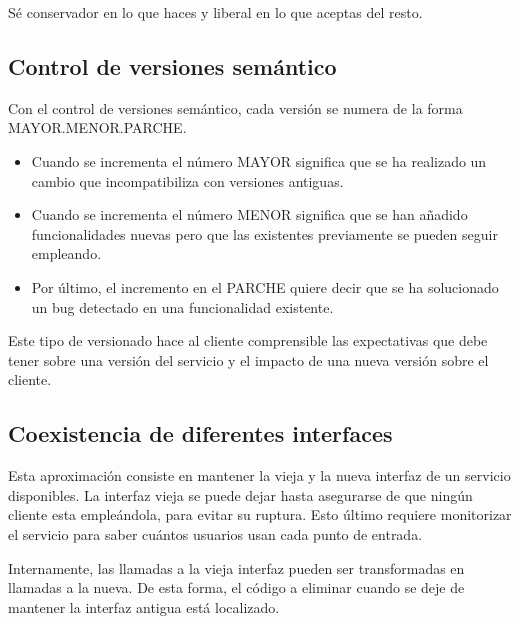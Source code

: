 \documentclass[11pt,a4paper]{article}
\begin{document}
\begin{center}
    \begin{minipage}{0.9\linewidth}
        {
			Sé conservador en lo que haces y liberal en lo que aceptas del resto.
        }
    \end{minipage}
\end{center}

\subsection{Control de versiones semántico}
Con el control de versiones semántico, cada versión se numera de la forma MAYOR.MENOR.PARCHE.

\begin{itemize}

\item Cuando se incrementa el número MAYOR significa que se ha realizado un cambio que incompatibiliza con versiones antiguas.

\item Cuando se incrementa el número MENOR significa que se han añadido funcionalidades nuevas pero que las existentes previamente se pueden seguir empleando.

\item Por último, el incremento en el PARCHE quiere decir que se ha solucionado un bug detectado en una funcionalidad existente.

\end{itemize}

Este tipo de versionado hace al cliente comprensible las expectativas que debe tener sobre una versión del servicio y el impacto de una nueva versión sobre el cliente.

\subsection{Coexistencia de diferentes interfaces}

Esta aproximación consiste en mantener la vieja y la nueva interfaz de un servicio disponibles. La interfaz vieja se puede dejar hasta asegurarse de que ningún cliente esta empleándola, para evitar su ruptura. Esto último requiere monitorizar el servicio para saber cuántos usuarios usan cada punto de entrada. 

Internamente, las llamadas a la vieja interfaz pueden ser transformadas en llamadas a la nueva. De esta forma, el código a eliminar cuando se deje de mantener la interfaz antigua está localizado.
\end{document}
